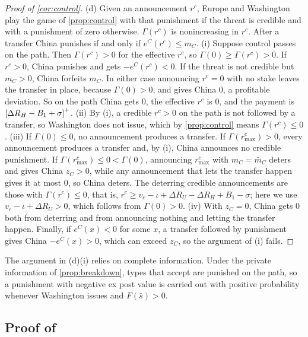 \begin{proof}[Proof of \cref{cor:control}]
(d) Given an announcement $r^c$, Europe and Washington play the game of \cref{prop:control} with that punishment if the threat is credible and with a punishment of zero otherwise. $\Gamma(r^c)$ is nonincreasing in $r^c$. After a transfer China punishes if and only if $e^C(r^c)\le m_C$.
(i) Suppose control passes on the path. Then $\Gamma(r^c)>0$ for the effective $r^c$, so $\Gamma(0)\ge\Gamma(r^c)>0$. If $r^c>0$, China punishes and gets $-e^C(r^c)<0$. If the threat is not credible but $m_C>0$, China forfeits $m_C$. In either case announcing $r^c=0$ with no stake leaves the transfer in place, because $\Gamma(0)>0$, and gives China $0$, a profitable deviation. So on the path China gets $0$, the effective $r^c$ is $0$, and the payment is $\left[\Delta R_H-B_1+\sigma\right]^{+}$.
(ii) By (i), a credible $r^c>0$ on the path is not followed by a transfer, so Washington does not issue, which by \cref{prop:control} means $\Gamma(r^c)\le 0$.
(iii) If $\Gamma(0)\le 0$, no announcement produces a transfer. If $\Gamma(r^c_{\max})>0$, every announcement produces a transfer and, by (i), China announces no credible punishment. If $\Gamma(r^c_{\max})\le 0<\Gamma(0)$, announcing $r^c_{\max}$ with $m_C=\bar m_C$ deters and gives China $z_C>0$, while any announcement that lets the transfer happen gives it at most $0$, so China deters. The deterring credible announcements are those with $\Gamma(r^c)\le 0$, that is, $r^c\ge v_c-\iota+\Delta R_U-\Delta R_H+B_1-\sigma$; here we use $v_c-\iota+\Delta R_U>0$, which follows from $\Gamma(0)>0$.
(iv) With $z_C=0$, China gets $0$ both from deterring and from announcing nothing and letting the transfer happen.
Finally, if $e^C(x)<0$ for some $x$, a transfer followed by punishment gives China $-e^C(x)>0$, which can exceed $z_C$, so the argument of (i) fails.
\end{proof}

The argument in (d)(i) relies on complete information. Under the private information of \cref{prop:breakdown}, types that accept are punished on the path, so a punishment with negative ex post value is carried out with positive probability whenever Washington issues and $F(\hat s)>0$.

\subsection{Proof of \texorpdfstring{}{spent and self-limiting cuts}}

